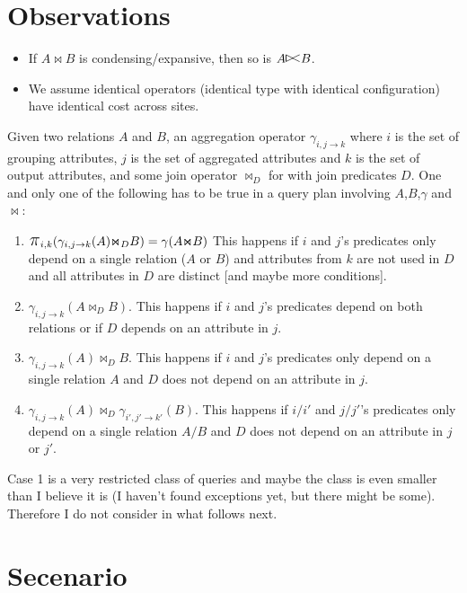 \documentclass[11pt]{article}
\newcommand{\join}{\mbox{$\Join$}}
\newcommand{\leftsemijoin}{\mbox{$\mathrel{\raise1pt\hbox{\vrule height5pt
depth0pt width0.6pt\hskip-1.5pt$>$\hskip -2.5pt$<$}}$}}
\newcommand{\project}{\mbox{\Large$\pi$}}
\begin{document}
\section*{Observations}

\begin{itemize}
\item{If $A \join B$ is condensing/expansive, then so is $A \leftsemijoin B$.}
\item{We assume identical operators (identical type with identical configuration) have identical cost across sites.}
\end{itemize}

Given two relations $A$ and $B$, an aggregation operator $\gamma_{i,j \rightarrow k}$ where $i$ is the set of grouping attributes, $j$ is the set of aggregated attributes and $k$ is the set of output attributes, and some join operator $\join_D$ for with join predicates $D$. One and only one of the following has to be true in a query plan involving $A$,$B$,$\gamma$ and $\join$:
 \begin{enumerate}
\item{$\project_{i,k}(\gamma_{i,j \rightarrow k}(A) \join_D B) = \gamma(A \join B) $ This happens if $i$ and $j$'s predicates only depend on a single relation ($A$ or $B$) and attributes from $k$ are not used in $D$ and all attributes in $D$ are distinct [and maybe more conditions].}
\item{ $\gamma_{i,j \rightarrow k} (A \join_D B)$. This happens if $i$ and $j$'s predicates depend on both relations or if $D$ depends on an attribute in $j$.}
\item{$\gamma_{i,j \rightarrow k}(A) \join_D B$. This happens if $i$ and $j$'s predicates only depend on a single relation $A$ and $D$ does not depend on an attribute in $j$.}
\item{$\gamma_{i,j \rightarrow k}(A) \join_D \gamma_{i',j' \rightarrow k'}(B)$. This happens if $i/i'$ and $j/j'$'s predicates only depend on a single relation $A/B$ and $D$ does not depend on an attribute in $j$ or $j'$.}
\end{enumerate}

Case 1 is a very restricted class of queries and maybe the class is even smaller than I believe it is (I haven't found exceptions yet, but there might be some). Therefore I do not consider in what follows next.

\pagebreak
\section*{Secenario}
\end{document}
